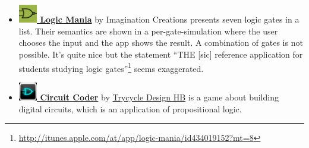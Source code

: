 \begin{itemize}
\item
\href{http://itunes.apple.com/at/app/logic-mania/id434019152?mt=8}{\bf 
\includegraphics[width=0.8cm]{related/LogicMania.png} Logic Mania} 
by 
{Imagination Creations} presents seven logic gates in a list. 
Their semantics are shown in a per-gate-simulation where the user chooses the input and the app shows the result. 
A combination of gates is not possible. It's quite nice but the statement “THE [sic] reference application for students 
studying logic gates”\footnote{
\url{http://itunes.apple.com/at/app/logic-mania/id434019152?mt=8}}
seems exaggerated.

\item
\href{http://itunes.apple.com/at/app/circuit-coder/id492180472?mt=8}{\bf 
\includegraphics[width=0.8cm]{related/CircuitCoder.png} Circuit Coder} 
by 
\href{http://sweyla.com/}{Trycycle Design HB} is a game about building digital circuits,
which is an application of propositional logic.

\end{itemize}
